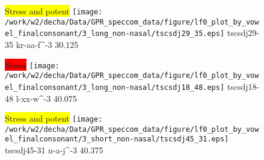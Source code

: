 \documentclass{article}
\begin{document}
\begin{figure}[t]
\begin{minipage}[b]{.24\textwidth}
\colorbox{yellow}{Stress and potent}
\centering
\texttt{[image: /work/w2/decha/Data/GPR\_speccom\_data/figure/lf0\_plot\_by\_vowel\_finalconsonant/3\_long\_non-nasal/tscsdj29\_35.eps]}
tscsdj29-35 kr-aa-f\textasciicircum-3 30.125
\end{minipage}
\begin{minipage}[b]{.24\textwidth}
\colorbox{red}{Stress}
\centering
\texttt{[image: /work/w2/decha/Data/GPR\_speccom\_data/figure/lf0\_plot\_by\_vowel\_finalconsonant/3\_long\_non-nasal/tscsdj18\_48.eps]}
tscsdj18-48 l-xx-w\textasciicircum-3 40.075
\end{minipage}
\begin{minipage}[b]{.24\textwidth}
\colorbox{yellow}{Stress and potent}
\centering
\texttt{[image: /work/w2/decha/Data/GPR\_speccom\_data/figure/lf0\_plot\_by\_vowel\_finalconsonant/3\_short\_non-nasal/tscsdj45\_31.eps]}
tscsdj45-31 n-a-j\textasciicircum-3 40.375
\end{minipage}
\end{figure}
\end{document}

